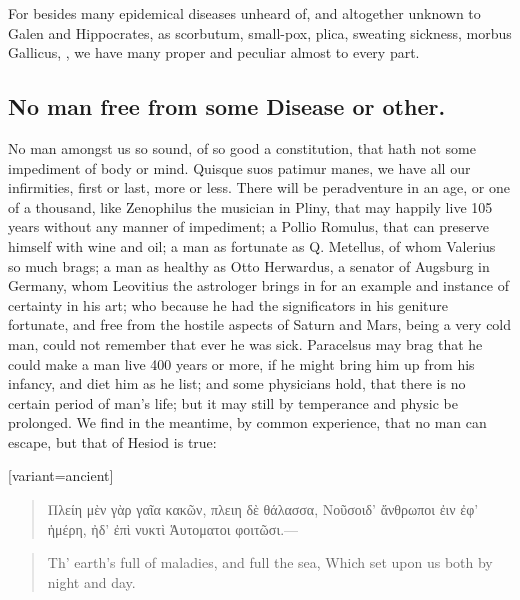{For besides many epidemical diseases unheard of, and altogether unknown
to Galen and Hippocrates, as scorbutum, small-pox, plica, sweating
sickness, morbus Gallicus, \etc{}, we have many proper and peculiar almost
to every part.
\subsection{No man free from some Disease or other.}
No man amongst us so sound,
of so good a constitution, that hath not some impediment of body or
mind. Quisque suos patimur manes, we have all our infirmities, first or
last, more or less. There will be peradventure in an age, or one of a
thousand, like Zenophilus the musician in Pliny, that may happily
live 105 years without any manner of impediment; a Pollio Romulus, that
can preserve himself with wine and oil; a man as fortunate as Q.
Metellus, of whom Valerius so much brags; a man as healthy as Otto
Herwardus, a senator of Augsburg in Germany, whom Leovitius the
astrologer brings in for an example and instance of certainty in his
art; who because he had the significators in his geniture fortunate,
and free from the hostile aspects of Saturn and Mars, being a very cold
man, could not remember that ever he was sick. Paracelsus may
brag that he could make a man live 400 years or more, if he might bring
him up from his infancy, and diet him as he list; and some physicians
hold, that there is no certain period of man's life; but it may still
by temperance and physic be prolonged. We find in the meantime, by
common experience, that no man can escape, but that of Hesiod is
true:

\begin{greek}[variant=ancient]
\begin{quote}
Πλείη μὲν γὰρ γαῖα κακῶν, πλειη δὲ θάλασσα,
Νοῦσοιδ' ἄνθρωποι ἐιν ἐφ' ἡμέρη, ἠδ' ἐπὶ νυκτὶ
Ἁυτοματοι φοιτῶσι.---
\end{quote}
\end{greek}

\begin{quote}
Th' earth's full of maladies, and full the sea,
Which set upon us both by night and day.
\end{quote}

}
